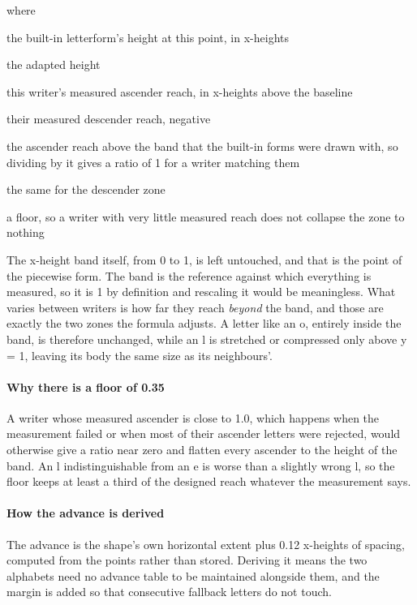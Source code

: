 \noindent where
\begin{description}[leftmargin=2.4em,style=nextline,font=\normalfont\ttfamily]\setlength\itemsep{1pt}
  \item[{$y$}] \normalfont the built-in letterform's height at this point, in x-heights
  \item[{$y'$}] \normalfont the adapted height
  \item[{$\mathrm{asc}$}] \normalfont this writer's measured ascender reach, in x-heights above the baseline
  \item[{$\mathrm{desc}$}] \normalfont their measured descender reach, negative
  \item[{$0.75$}] \normalfont the ascender reach above the band that the built-in forms were drawn with, so dividing by it gives a ratio of 1 for a writer matching them
  \item[{$0.55$}] \normalfont the same for the descender zone
  \item[{$\max(0.35,\cdot)$}] \normalfont a floor, so a writer with very little measured reach does not collapse the zone to nothing
\end{description}
The x-height band itself, from 0 to 1, is left untouched, and that is the point of the piecewise form. The band is the reference against which everything is measured, so it is 1 by definition and rescaling it would be meaningless. What varies between writers is how far they reach \emph{beyond} the band, and those are exactly the two zones the formula adjusts. A letter like an o, entirely inside the band, is therefore unchanged, while an l is stretched or compressed only above y = 1, leaving its body the same size as its neighbours'.


\paragraph{Why there is a floor of 0.35}
A writer whose measured ascender is close to 1.0, which happens when the measurement failed or when most of their ascender letters were rejected, would otherwise give a ratio near zero and flatten every ascender to the height of the band. An l indistinguishable from an e is worse than a slightly wrong l, so the floor keeps at least a third of the designed reach whatever the measurement says.


\paragraph{How the advance is derived}
The advance is the shape's own horizontal extent plus 0.12 x-heights of spacing, computed from the points rather than stored. Deriving it means the two alphabets need no advance table to be maintained alongside them, and the margin is added so that consecutive fallback letters do not touch.


